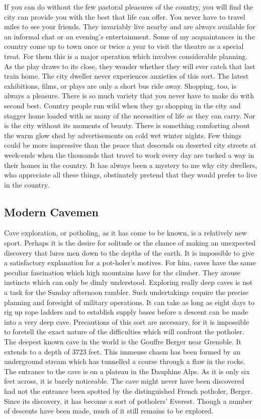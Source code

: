 \documentclass[11pt]{article}
\begin{document}
If you can do without the few pastoral pleasures of the country, you will find the city can provide you with the best that life can offer. You never have to travel miles to see your friends. They invariably live nearby and are always available for an informal chat or an evening's entertainment. Some of my acquaintances in the country come up to town once or twice a year to visit the theatre as a special treat. For them this is a major operation which involves considerable planning. As the play draws to its close, they wonder whether they will ever catch that last train home. The city dweller never experiences anxieties of this sort. The latest exhibitions, films, or plays are only a short bus ride away. Shopping, too, is always a pleasure. There is so much variety that you never have to make do with second best. Country people run wild when they go shopping in the city and stagger home loaded with as many of the necessities of life as they can carry. Nor is the city without its moments of beauty. There is something comforting about the warm glow shed by advertisements on cold wet winter nights. Few things could be more impressive than the peace that descends on deserted city streets at week-ends when the thousands that travel to work every day are tucked a way in their homes in the country. It has always been a mystery to me why city dwellers, who appreciate all these things, obstinately pretend that they would prefer to live in the country. 
\subsection{Modern Cavemen}
\label{sec-1-42}

Cave exploration, or potholing, as it has come to be known, is a relatively new sport. Perhaps it is the desire for solitude or the chance of making an unexpected discovery that lures men down to the depths of the earth. It is impossible to give a satisfactory explanation for a pot-holer's motives. For him, caves have the same peculiar fascination which high mountains have for the climber. They arouse instincts which can only be dimly understood. Exploring really deep caves is not a task for the Sunday afternoon rambler. Such undertakings require the precise planning and foresight of military operations. It can take as long as eight days to rig up rope ladders and to establish supply bases before a descent can be made into a very deep cave. Precautions of this sort are necessary, for it is impossible to foretell the exact nature of the difficulties which will confront the potholer. The deepest known cave in the world is the Gouffre Berger near Grenoble. It extends to a depth of 3723 feet. This immense chasm has been formed by an underground stream which has tunnelled a course through a flaw in the rocks. The entrance to the cave is on a plateau in the Dauphine Alps. As it is only six feet across, it is barely noticeable. The cave might never have been discovered had not the entrance been spotted by the distinguished French potholer, Berger. Since its discovery, it has become a sort of potholers' Everest. Though a number of descents have been made, much of it still remains to be explored. 
\end{document}
